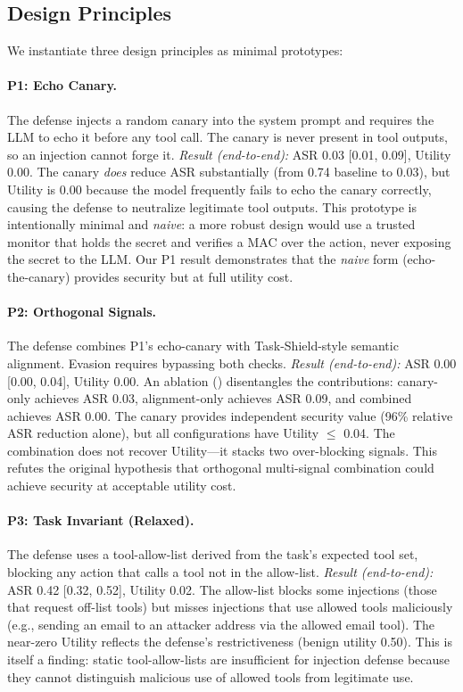 \subsection{Design Principles}

We instantiate three design principles as minimal prototypes:

\paragraph{P1: Echo Canary.}
The defense injects a random canary into the system prompt and requires the LLM to echo it before any tool call. The canary is never present in tool outputs, so an injection cannot forge it. \emph{Result (end-to-end):} ASR 0.03 [0.01, 0.09], Utility 0.00. The canary \emph{does} reduce ASR substantially (from 0.74 baseline to 0.03), but Utility is 0.00 because the model frequently fails to echo the canary correctly, causing the defense to neutralize legitimate tool outputs. This prototype is intentionally minimal and \emph{naive}: a more robust design would use a trusted monitor that holds the secret and verifies a MAC over the action, never exposing the secret to the LLM. Our P1 result demonstrates that the \emph{naive} form (echo-the-canary) provides security but at full utility cost.

\paragraph{P2: Orthogonal Signals.}
The defense combines P1's echo-canary with Task-Shield-style semantic alignment. Evasion requires bypassing both checks. \emph{Result (end-to-end):} ASR 0.00 [0.00, 0.04], Utility 0.00. An ablation () disentangles the contributions: canary-only achieves ASR 0.03, alignment-only achieves ASR 0.09, and combined achieves ASR 0.00. The canary provides independent security value (96\% relative ASR reduction alone), but all configurations have Utility $\leq$ 0.04. The combination does not recover Utility---it stacks two over-blocking signals. This refutes the original hypothesis that orthogonal multi-signal combination could achieve security at acceptable utility cost.

\paragraph{P3: Task Invariant (Relaxed).}
The defense uses a tool-allow-list derived from the task's expected tool set, blocking any action that calls a tool not in the allow-list. \emph{Result (end-to-end):} ASR 0.42 [0.32, 0.52], Utility 0.02. The allow-list blocks some injections (those that request off-list tools) but misses injections that use allowed tools maliciously (e.g., sending an email to an attacker address via the allowed email tool). The near-zero Utility reflects the defense's restrictiveness (benign utility 0.50). This is itself a finding: static tool-allow-lists are insufficient for injection defense because they cannot distinguish malicious use of allowed tools from legitimate use.

